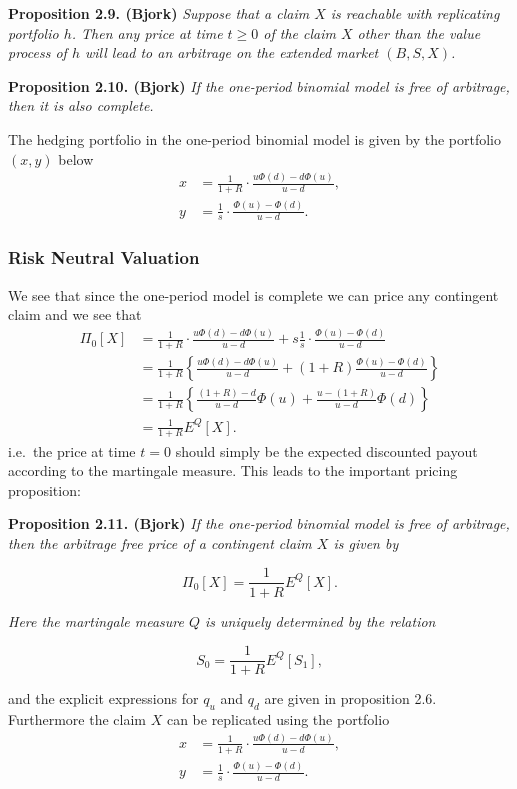 \documentclass[
]{book}
\begin{document}
\textbf{Proposition 2.9. (Bjork)} \emph{Suppose that a claim \(X\) is reachable with replicating portfolio \(h\). Then any price at time \(t\ge 0\) of the claim \(X\) other than the value process of \(h\) will lead to an arbitrage on the extended market \((B,S,X)\).}

\textbf{Proposition 2.10. (Bjork)} \emph{If the one-period binomial model is free of arbitrage, then it is also complete.}

The hedging portfolio in the one-period binomial model is given by the portfolio \((x,y)\) below
\begin{align*}
x&=\frac{1}{1+R}\cdot\frac{u\Phi(d)-d\Phi(u)}{u-d},\tag{2.2}\\
y&=\frac{1}{s}\cdot\frac{\Phi(u)-\Phi(d)}{u-d}.\tag{2.3}
\end{align*}

\hypertarget{risk-neutral-valuation}{%
\subsubsection{Risk Neutral Valuation}\label{risk-neutral-valuation}}

We see that since the one-period model is complete we can price any contingent claim and we see that
\begin{align*}
\Pi_0[X]&=\frac{1}{1+R}\cdot\frac{u\Phi(d)-d\Phi(u)}{u-d}+s\frac{1}{s}\cdot\frac{\Phi(u)-\Phi(d)}{u-d}\\
&=\frac{1}{1+R}\left\{\frac{u\Phi(d)-d\Phi(u)}{u-d}+(1+R)\frac{\Phi(u)-\Phi(d)}{u-d}\right\}\\
&=\frac{1}{1+R}\left\{\frac{(1+R)-d}{u-d}\Phi(u)+\frac{u-(1+R)}{u-d}\Phi(d)\right\}\\
&=\frac{1}{1+R}E^Q[X].
\end{align*}
i.e.~the price at time \(t=0\) should simply be the expected discounted payout according to the martingale measure. This leads to the important pricing proposition:

\textbf{Proposition 2.11. (Bjork)} \emph{If the one-period binomial model is free of arbitrage, then the arbitrage free price of a contingent claim \(X\) is given by}

\[
\Pi_0[X]=\frac{1}{1+R}E^Q[X].\tag{2.4}
\]

\emph{Here the martingale measure \(Q\) is uniquely determined by the relation}

\[
S_0=\frac{1}{1+R}E^Q[S_1],\tag{2.5}
\]

and the explicit expressions for \(q_u\) and \(q_d\) are given in proposition 2.6. Furthermore the claim \(X\) can be replicated using the portfolio
\begin{align*}
x&=\frac{1}{1+R}\cdot\frac{u\Phi(d)-d\Phi(u)}{u-d},\tag{2.6}\\
y&=\frac{1}{s}\cdot\frac{\Phi(u)-\Phi(d)}{u-d}.\tag{2.7}
\end{align*}
\end{document}

